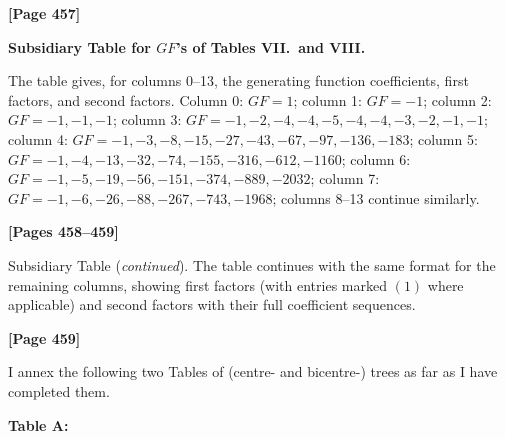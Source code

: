 \documentclass[11pt,a4paper]{article}
\begin{document}
\newpage
\textbf{[Page 457]}

\begin{center}
\textbf{Subsidiary Table for $GF$'s of Tables VII.\ and VIII.}
\end{center}

\begin{small}
The table gives, for columns 0--13, the generating function coefficients, first factors, and second factors. Column 0: $GF = 1$; column 1: $GF = -1$; column 2: $GF = -1,-1,-1$; column 3: $GF = -1,-2,-4,-4,-5,-4,-4,-3,-2,-1,-1$; column 4: $GF = -1,-3,-8,-15,-27,-43,-67,-97,-136,-183$; column 5: $GF = -1,-4,-13,-32,-74,-155,-316,-612,-1160$; column 6: $GF = -1,-5,-19,-56,-151,-374,-889,-2032$; column 7: $GF = -1,-6,-26,-88,-267,-743,-1968$; columns 8--13 continue similarly.
\end{small}

\textbf{[Pages 458--459]}

Subsidiary Table (\textit{continued}). The table continues with the same format for the remaining columns, showing first factors (with entries marked $(1)$ where applicable) and second factors with their full coefficient sequences.

\textbf{[Page 459]}

I annex the following two Tables of (centre- and bicentre-) trees as far as I have completed them.

\begin{center}
\textbf{Table A:}
\end{center}
\end{document}
